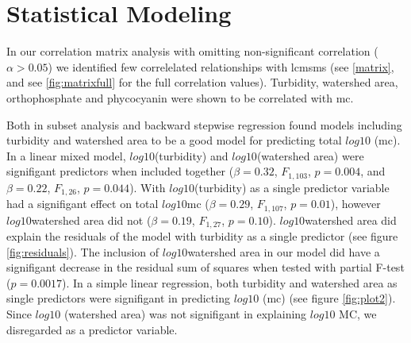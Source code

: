 \section{Statistical Modeling}

In our correlation matrix analysis with omitting non-significant correlation ($\alpha>0.05$) we identified few correlelated relationships with \gls{lcmsms} (see \ref{matrix}, and see \ref{fig:matrixfull} for the full correlation values). Turbidity, watershed area, orthophosphate and phycocyanin were shown to be correlated with \gls{mc}.




Both in subset analysis and backward stepwise regression found models including turbidity and watershed area to be a good model for predicting total $log10$ (\gls{mc}). In a linear mixed model, $log10$(turbidity) and $log10$(watershed area) were signifigant predictors when included together ($\beta=0.32$, $F_{{1,103}}$, $p=0.004$, and $\beta=0.22$, $F_{{1,26}}$, $p=0.044$). With $log10$(turbidity) as a single predictor variable had a signifigant effect on total $log10$\gls{mc} ($\beta=0.29$, $F_{{1,107}}$, $p=0.01$), however $log10$watershed area did not ($\beta=0.19$, $F_{{1,27}}$, $p=0.10$).  $log10$watershed area did explain the residuals of the model with turbidity as a single predictor (see figure \ref{fig:residuals}). The inclusion of $log10$watershed area in our model did have a signifigant decrease in the residual sum of squares when tested with partial F-test ($p=0.0017$). In a simple linear regression, both turbidity and watershed area as single predictors were signifigant in predicting $log10$ (\gls{mc}) (see figure \ref{fig:plot2}). Since $log10$ (watershed area) was not signifigant in explaining $log10$ MC, we disregarded as a predictor variable.

